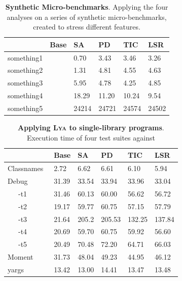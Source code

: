 \documentclass[letterpaper,twocolumn,10pt]{article}
\newcommand{\sys}{{\scshape Lya}\xspace}
\newcommand{\fixme}[1]{{\color{red}#1}}
\begin{document}
\begin{table}[t]
\center
\footnotesize
\setlength\tabcolsep{3pt}
\caption{
  \footnotesize{
    \textbf{Synthetic Micro-benchmarks}.
		Applying the four analyses on a series of synthetic micro-benchmarks, created to stress different features.
  }
}
\begin{tabular*}{\columnwidth}{l @{\extracolsep{\fill}} ll lll}
\toprule
              &   Base    &  SA     & PD       &   TIC    &   LSR     \\
\midrule
something1    &           &  0.70   &    3.43  &   3.46   &   3.26    \\
something2    &           &  1.31   &    4.81  &   4.55   &   4.63    \\
something3    &           &  5.95   &    4.78  &   4.25   &   4.85    \\
something4    &           &  18.29  &   11.20  &   10.24  &   9.54    \\
something5    &           &  24214  &   24721  &   24574  &   24502   \\
\bottomrule
\end{tabular*}
\label{tab:synthetic}
\vspace{-5mm}
\end{table}

\begin{table}[t]
\center
\footnotesize
\setlength\tabcolsep{3pt}
\caption{
  \footnotesize{
    \textbf{Applying \sys to single-library programs}.
		\fixme{Execution time of four test suites against }
  }
}
\begin{tabular*}{\columnwidth}{l @{\extracolsep{\fill}} ll lll}
\toprule
                    & Base   &  SA   & PD     &   TIC   & LSR     \\
\midrule
Classnames~\cite{}  &  2.72  & 6.62  &  6.61  &  6.10   & 5.94    \\
Debug~\cite{}       & 31.39  & 33.54 &  33.94 &  33.96  & 33.04   \\
~~~-t1              & 31.46  & 60.13 &  60.00 &  56.62  & 56.72   \\
~~~-t2              & 19.17  & 59.77 &  60.75 &  57.15  & 57.79   \\
~~~-t3              & 21.64  & 205.2 &  205.53&  132.25 & 137.84  \\
~~~-t4              & 20.69  & 59.70 &  60.75 &  59.92  & 56.60   \\
~~~-t5              & 20.49  & 70.48 &  72.20 &  64.71  & 66.03   \\
Moment~\cite{}      & 31.73  & 48.04 &  49.23 &  44.95  & 46.12   \\
yargs~\cite{}       & 13.42  & 13.00 &  14.41 &  13.47  & 13.48   \\
\bottomrule
\end{tabular*}
\label{tab:meso}
\vspace{-5mm}
\end{table}
\end{document}
